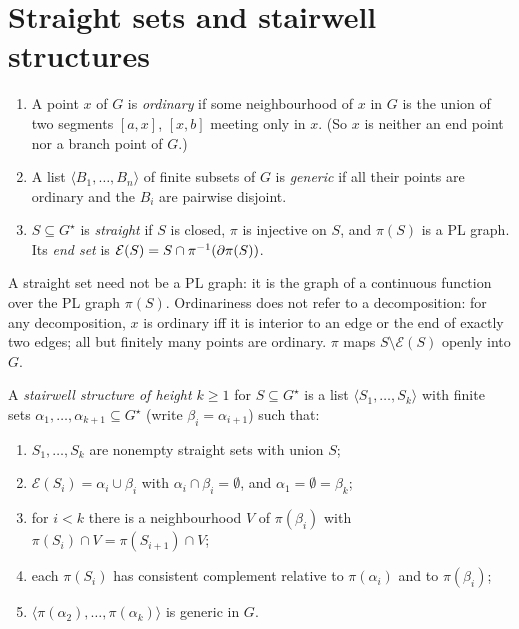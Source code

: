 
\section{Straight sets and stairwell structures}

\begin{definition}\label{def:straight}
\begin{enumerate}[label=(\alph*)]
\item A point $x$ of $G$ is \emph{ordinary} if some neighbourhood of $x$ in $G$ is the union of two segments $[a,x]$, $[x,b]$ meeting only in $x$. (So $x$ is neither an end point
nor a branch point of $G$.)
\item A list $\langle B_1,\dots,B_n\rangle$ of finite subsets of $G$ is \emph{generic} if all their points are ordinary and the $B_i$ are pairwise disjoint.
\item $S\subseteq G^\star$ is \emph{straight} if $S$ is closed, $\pi$ is injective on $S$, and $\pi(S)$ is a PL graph. Its \emph{end set} is $\mathcal E(S)=S\cap\pi^{-1}(\partial\pi(S))$.
\end{enumerate}
\end{definition}


A straight set need not be a PL graph: it is the graph of a continuous function over the PL graph $\pi(S)$. Ordinariness does not refer to a decomposition:
for any decomposition, $x$ is ordinary iff it is interior to an edge or the end of exactly two edges; all but finitely many points are ordinary. $\pi$ maps
$S\setminus\mathcal E(S)$ openly into $G$.


\begin{definition}\label{def:stairwell}
A \emph{stairwell structure of height $k\ge1$} for $S\subseteq G^\star$ is a list $\langle S_1,\dots,S_k\rangle$ with finite sets $\alpha_1,\dots,\alpha_{k+1}\subseteq G^\star$ (write
$\beta_i=\alpha_{i+1}$) such that:
\begin{enumerate}[label=(S\arabic*)]
\item $S_1,\dots,S_k$ are nonempty straight sets with union $S$;
\item $\mathcal E(S_i)=\alpha_i\cup\beta_i$ with $\alpha_i\cap\beta_i=\emptyset$, and $\alpha_1=\emptyset=\beta_k$;
\item for $i<k$ there is a neighbourhood $V$ of $\pi(\beta_i)$ with $\pi(S_i)\cap V=\pi(S_{i+1})\cap V$;
\item each $\pi(S_i)$ has consistent complement relative to $\pi(\alpha_i)$ and to $\pi(\beta_i)$;
\item $\langle\pi(\alpha_2),\dots,\pi(\alpha_k)\rangle$ is generic in $G$.
\end{enumerate}
\end{definition}

